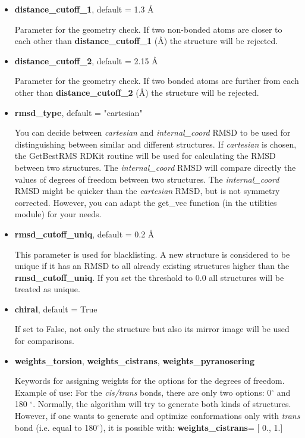 \documentclass[a4paper]{article}
\begin{document}
\begin{itemize}
	\item{\textbf{distance\_cutoff\_1}}, default = 1.3 \AA
	
Parameter for the geometry check. If two non-bonded atoms 	are closer to each other than \textbf{distance\_cutoff\_1} (\AA) the structure will be rejected. 


\item{\textbf{distance\_cutoff\_2}}, default = 2.15 \AA
	
Parameter for the geometry check. If two bonded atoms are further from each other than \textbf{distance\_cutoff\_2} (\AA) the structure will be rejected.

	\item{\textbf{rmsd\_type}}, default = "cartesian"
	
You can decide between \textit{cartesian} and \textit{internal\_coord} RMSD to be used for distinguishing between similar and different structures. If \textit{cartesian} is chosen, the GetBestRMS RDKit routine will be used for calculating the RMSD between two structures. The \textit{internal\_coord} RMSD will compare directly the values of degrees of freedom between two structures. The \textit{internal\_coord} RMSD might be quicker than the \textit{cartesian} RMSD, but is not symmetry corrected. However, you can adapt the get\_vec function (in the utilities module) for your needs. 


	\item{\textbf{rmsd\_cutoff\_uniq}}, default = 0.2 \AA

This parameter is used for blacklisting. A new structure is considered to be unique if it has an RMSD to all already existing structures higher than the \textbf{rmsd\_cutoff\_uniq}. If you set the threshold to 0.0 all structures will be treated as unique. 

	\item{\textbf{chiral}}, default = True
	
If set to False, not only the structure but also its mirror image will be used for comparisons. 


	\item{\textbf{weights\_torsion}, \textbf{weights\_cistrans}, \textbf{weights\_pyranosering}}

Keywords for assigning weights for the options for the degrees of freedom.
Example of use:
For the \textit{cis/trans} bonds, there are only two options: 0$^{\circ}$ and 180 $^{\circ}$. Normally, the algorithm will try to generate both kinds of structures. However, if one wants to generate and optimize conformations only with \textit{trans} bond (i.e. equal to 180$^{\circ}$), it is possible  with: \textbf{weights\_cistrans}= [ 0., 1.]


\end{itemize}
\end{document}
